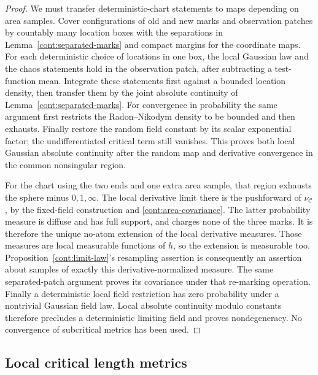 \begin{proof}
We must transfer deterministic-chart statements to maps depending on area
samples.  Cover configurations of old and new marks and observation patches
by countably many location boxes with the separations in
Lemma~\ref{cont:separated-marks} and compact margins for the coordinate maps.
For each deterministic choice of locations in one box, the local Gaussian
law and the chaos statements hold in the observation patch, after subtracting
a test-function mean.  Integrate these statements first against a bounded
location density, then transfer them by the joint absolute continuity of
Lemma~\ref{cont:separated-marks}.  For convergence in probability the same
argument first restricts the Radon--Nikodym density to be bounded and then
exhausts.  Finally restore the random field constant by its scalar
exponential factor; the undifferentiated critical term still vanishes.
This proves both local Gaussian absolute continuity after the random map
and derivative convergence in the common nonsingular region.

For the chart using the two ends and one extra area sample, that region
exhausts the sphere minus $0,1,\infty$.  The local derivative limit there is
the pushforward of $\nu_{\mathcal C}$, by the fixed-field construction and
\eqref{cont:area-covariance}.  The latter probability measure is diffuse and
has full support, and charges none of the three marks.  It is therefore the
unique no-atom extension of the local derivative measures.  Those measures
are local measurable functions of $h$, so the extension is measurable too.
Proposition~\ref{cont:limit-law}'s resampling assertion is consequently an
assertion about samples of exactly this derivative-normalized measure.
The same separated-patch argument proves its covariance under that
re-marking operation.  Finally a deterministic local field restriction has
zero probability under a nontrivial Gaussian field law.  Local absolute
continuity modulo constants therefore precludes a deterministic limiting
field and proves nondegeneracy.  No convergence of subcritical metrics has
been used.
\end{proof}

\subsection{Local critical length metrics}\label{cont:local-metrics-section}

